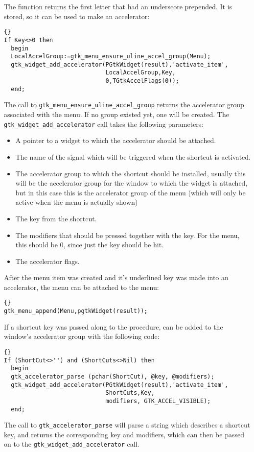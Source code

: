 \documentclass[10pt]{article}
\begin{document}
The function returns the first letter that had an underscore prepended. It
is stored, so it can be used to make an accelerator:
\begin{lstlisting}{}
If Key<>0 then
  begin
  LocalAccelGroup:=gtk_menu_ensure_uline_accel_group(Menu);
  gtk_widget_add_accelerator(PGtkWidget(result),'activate_item',
                             LocalAccelGroup,Key,
                             0,TGtkAccelFlags(0));
  end;
\end{lstlisting}
The call to \lstinline|gtk_menu_ensure_uline_accel_group| returns the 
accelerator group associated with the menu. If no group existed yet, one
will be created. The \lstinline|gtk_widget_add_accelerator| call takes the
following parameters:
\begin{itemize}
\item A pointer to a widget to which the accelerator should be attached.
\item The name of the signal which will be triggered when the shortcut 
is activated.
\item The accelerator group to which the shortcut should be installed,
usually this will be the accelerator group for the window to which the
widget is attached, but in this case this is the accelerator group of the
menu (which will only be active when the menu is actually shown)
\item The key from the shortcut.
\item The modifiers that should be pressed together with the key. For the
menu, this should be 0, since just the key should be hit.
\item The accelerator flags.
\end{itemize}

After the menu item was created and it's underlined key was made into an
accelerator, the menu can be attached to the menu:
\begin{lstlisting}{}
gtk_menu_append(Menu,pgtkWidget(result));
\end{lstlisting}

If a shortcut key was passed along to the procedure, can be added to the
window's accelerator group with the following code:
\begin{lstlisting}{}
If (ShortCut<>'') and (ShortCuts<>Nil) then  
  begin
  gtk_accelerator_parse (pchar(ShortCut), @key, @modifiers);
  gtk_widget_add_accelerator(PGtkWidget(result),'activate_item',
                             ShortCuts,Key,
                             modifiers, GTK_ACCEL_VISIBLE);
  end;
\end{lstlisting}
The call to \lstinline|gtk_accelerator_parse| will parse a string which
describes a shortcut key, and returns the corresponding key and modifiers,
which can then be passed on to the \lstinline|gtk_widget_add_accelerator|
call.
\end{document}
